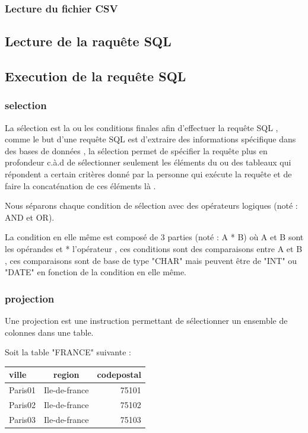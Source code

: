 \documentclass[oneside,13pt,a4paper]{report}
\begin{document}
\subsubsection{Lecture du fichier CSV}


\subsection{Lecture de la raquête SQL}



\subsection{Execution de la requête SQL}

\subsubsection{selection}

La sélection est la ou les conditions finales afin d'effectuer la requête SQL , comme le but d'une requête SQL est d'extraire des informations spécifique dans des bases de données , la sélection permet de spécifier la requête plus en profondeur c.à.d de sélectionner seulement les éléments du ou des tableaux qui répondent a certain critères donné par la personne qui exécute la requête et de faire la concaténation de ces éléments là .

Nous séparons chaque condition de sélection avec des opérateurs logiques (noté : AND et OR).

La condition en elle même est composé de 3 parties (noté : A * B) où A et B sont les opérandes et * l'opérateur , ces conditions sont des comparaisons entre A et B , ces comparaisons sont de base de type "CHAR" mais peuvent être de "INT" ou "DATE" en fonction de la condition en elle même.

\subsubsection{projection}

Une projection est une instruction permettant de sélectionner un ensemble de colonnes dans une table.

Soit la table "FRANCE" suivante :

\begin{tabular}{|l|c|r|}
	\hline
	ville   & region        & codepostal
	\\
	\hline
	Paris01 & Ile-de-france & 75101      \\
	Paris02 & Ile-de-france & 75102      \\
	Paris03 & Ile-de-france & 75103      \\
	\hline
\end{tabular}
\end{document}
